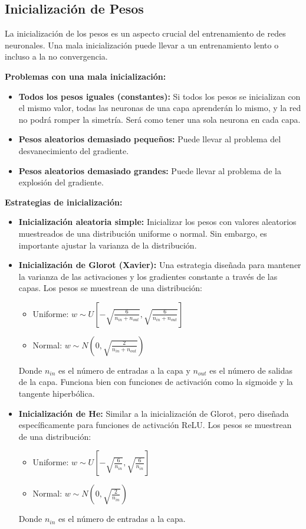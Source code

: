 \documentclass{article}
\begin{document}
\subsection{Inicialización de Pesos}

La inicialización de los pesos es un aspecto crucial del entrenamiento de redes neuronales. Una mala inicialización puede llevar a un entrenamiento lento o incluso a la no convergencia.

\textbf{Problemas con una mala inicialización:}
\begin{itemize}
    \item \textbf{Todos los pesos iguales (constantes):} Si todos los pesos se inicializan con el mismo valor, todas las neuronas de una capa aprenderán lo mismo, y la red no podrá romper la simetría. Será como tener una sola neurona en cada capa.
    \item \textbf{Pesos aleatorios demasiado pequeños:}  Puede llevar al problema del desvanecimiento del gradiente.
    \item \textbf{Pesos aleatorios demasiado grandes:} Puede llevar al problema de la explosión del gradiente.
\end{itemize}

\textbf{Estrategias de inicialización:}

\begin{itemize}
    \item \textbf{Inicialización aleatoria simple:}  Inicializar los pesos con valores aleatorios muestreados de una distribución uniforme o normal.  Sin embargo, es importante ajustar la varianza de la distribución.
    \item \textbf{Inicialización de Glorot (Xavier):}  Una estrategia diseñada para mantener la varianza de las activaciones y los gradientes constante a través de las capas.  Los pesos se muestrean de una distribución:
    \begin{itemize}
       \item Uniforme:  \( w \sim U\left[-\sqrt{\frac{6}{n_{in} + n_{out}}}, \sqrt{\frac{6}{n_{in} + n_{out}}}\right] \)
        \item Normal: \( w \sim N\left(0, \sqrt{\frac{2}{n_{in} + n_{out}}}\right) \)
    \end{itemize}
   
   
    Donde \(n_{in}\) es el número de entradas a la capa y \(n_{out}\) es el número de salidas de la capa. Funciona bien con funciones de activación como la sigmoide y la tangente hiperbólica.
     \item \textbf{Inicialización de He:}  Similar a la inicialización de Glorot, pero diseñada específicamente para funciones de activación ReLU. Los pesos se muestrean de una distribución:
    \begin{itemize}
      \item Uniforme:  \( w \sim U\left[-\sqrt{\frac{6}{n_{in}}}, \sqrt{\frac{6}{n_{in}}}\right] \)
        \item Normal: \( w \sim N\left(0, \sqrt{\frac{2}{n_{in}}}\right) \)
    \end{itemize}
    Donde \(n_{in}\) es el número de entradas a la capa.
\end{itemize}
\end{document}
